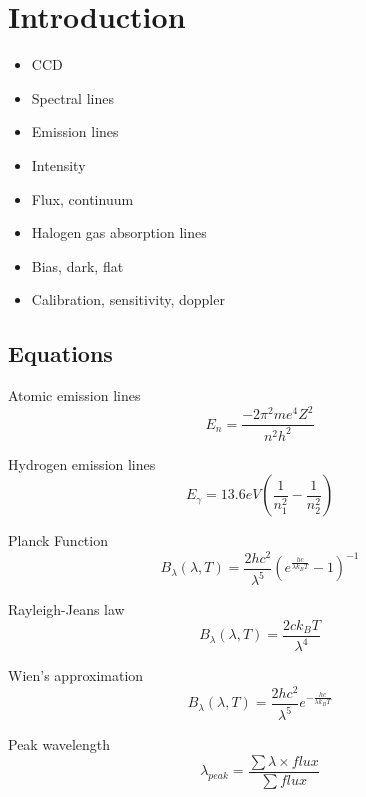 \documentclass[twocolumn]{aastex6}
\begin{document}
\section{Introduction}
\begin{itemize}
	\item{CCD}
	\item{Spectral lines}
	\item{Emission lines}
	\item{Intensity}
	\item{Flux, continuum}
	\item{Halogen gas absorption lines}
	\item{Bias, dark, flat}
	\item{Calibration, sensitivity, doppler}
\end{itemize}

\subsection{Equations}

Atomic emission lines
\begin{equation}
E_n = \frac{-2\pi ^2 me^4 Z^2}{n^2 h^2}
\end{equation}


Hydrogen emission lines
\begin{equation}
E_\gamma = 13.6eV\left( \frac{1}{n_1^2} - \frac{1}{n_2^2}\right)
\end{equation}

Planck Function
\begin{equation}
B_\lambda(\lambda, T) = \frac{2hc^2}{\lambda^5}\left(e^{\frac{hc}{\lambda k_B T}}-1\right)^{-1}
\end{equation}

Rayleigh-Jeans law
\begin{equation}
B_\lambda(\lambda, T) = \frac{2ck_BT}{\lambda^4}
\end{equation}

Wien's approximation
\begin{equation}
B_\lambda(\lambda, T) = \frac{2hc^2}{\lambda^5}e^{-\frac{hc}{\lambda k_B T}}
\end{equation}

Peak wavelength
\begin{equation}
\lambda_{peak} = \frac{\sum\lambda \times flux}{\sum flux}
\end{equation}
\end{document}
